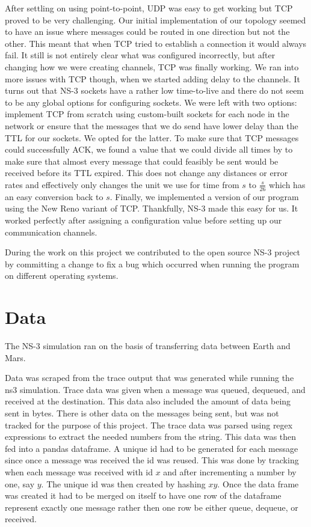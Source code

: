 \documentclass[a4paper,12pt]{article}
\begin{document}
After settling on using point-to-point, UDP was easy to get working but TCP
proved to be very challenging. Our initial implementation of our topology seemed
to have an issue where messages could be routed in one direction but not the
other. This meant that when TCP tried to establish a connection it would always
fail. It still is not entirely clear what was configured incorrectly, but after
changing how we were creating channels, TCP was finally working. We ran into
more issues with TCP though, when we started adding delay to the channels. It
turns out that NS-3 sockets have a rather low time-to-live and there do not seem
to be any global options for configuring sockets. We were left with two options:
implement TCP from scratch using custom-built sockets for each node in the
network or ensure that the messages that we do send have lower delay than the
TTL for our sockets. We opted for the latter. To make sure that TCP messages
could successfully ACK, we found a value that we could divide all times by to
make sure that almost every message that could feasibly be sent would be
received before its TTL expired. This does not change any distances or error
rates and effectively only changes the unit we use for time from $s$ to
$\frac{s}{26}$ which has an easy conversion back to $s$. Finally, we implemented
a version of our program using the New Reno variant of TCP. Thankfully, NS-3
made this easy for us. It worked perfectly after assigning a configuration value
before setting up our communication channels.

During the work on this project we contributed to the open source NS-3 project 
by committing a change to fix a bug which occurred when running the program on 
different operating systems.

\section{Data}
The NS-3 simulation ran on the basis of transferring data between Earth and 
Mars.

Data was scraped from the trace output that was generated while running the 
ns3 simulation. Trace data was given when a message was queued, dequeued, 
and received at the destination. This data also included the amount of 
data being sent in bytes. There is other data on the messages being sent, but 
was not tracked for the purpose of this project. The trace data was parsed 
using regex expressions to extract the needed numbers from the string.
This data was then fed into a pandas dataframe. A unique id had to be 
generated for each message since once a message was received the id was 
reused. This was done by tracking when each message was received with id 
$x$ and after incrementing a number by one, say $y$. The unique id was then 
created by hashing $xy$. Once the data frame was created it had to be merged 
on itself to have one row of the dataframe represent exactly one message rather 
then one row be either queue, dequeue, or received.
\end{document}

